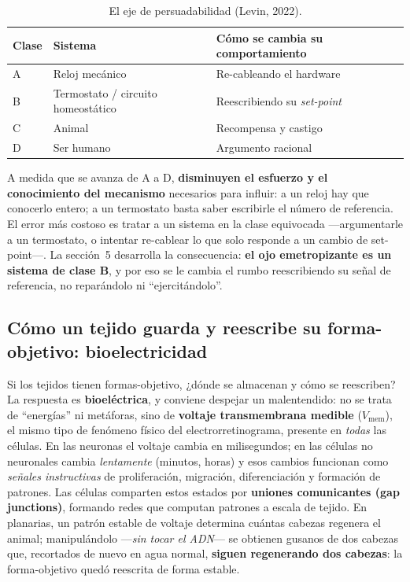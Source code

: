 \documentclass[11pt,a4paper]{article}
\begin{document}
\begin{table}[h]
\centering
\caption{El eje de persuadabilidad (Levin, 2022).}
\label{tab:persuad}
\begin{tabular}{@{}lll@{}}
\toprule
\textbf{Clase} & \textbf{Sistema} & \textbf{Cómo se cambia su comportamiento} \\
\midrule
A & Reloj mecánico & Re-cableando el hardware \\
B & Termostato / circuito homeostático & Reescribiendo su \emph{set-point} \\
C & Animal & Recompensa y castigo \\
D & Ser humano & Argumento racional \\
\bottomrule
\end{tabular}
\end{table}

A medida que se avanza de A a D, \textbf{disminuyen el esfuerzo y el conocimiento del mecanismo} necesarios para influir: a un reloj hay que conocerlo entero; a un termostato basta saber escribirle el número de referencia. El error más costoso es tratar a un sistema en la clase equivocada ---argumentarle a un termostato, o intentar re-cablear lo que solo responde a un cambio de set-point---. La sección~5 desarrolla la consecuencia: \textbf{el ojo emetropizante es un sistema de clase B}, y por eso se le cambia el rumbo reescribiendo su señal de referencia, no reparándolo ni \enquote{ejercitándolo}.

\subsection{Cómo un tejido guarda y reescribe su forma-objetivo: bioelectricidad}

Si los tejidos tienen formas-objetivo, ¿dónde se almacenan y cómo se reescriben? La respuesta es \textbf{bioeléctrica}, y conviene despejar un malentendido: no se trata de \enquote{energías} ni metáforas, sino de \textbf{voltaje transmembrana medible} ($V_\mathrm{mem}$), el mismo tipo de fenómeno físico del electrorretinograma, presente en \emph{todas} las células. En las neuronas el voltaje cambia en milisegundos; en las células no neuronales cambia \emph{lentamente} (minutos, horas) y esos cambios funcionan como \emph{señales instructivas} de proliferación, migración, diferenciación y formación de patrones. Las células comparten estos estados por \textbf{uniones comunicantes (gap junctions)}, formando redes que computan patrones a escala de tejido. En planarias, un patrón estable de voltaje determina cuántas cabezas regenera el animal; manipulándolo ---\emph{sin tocar el ADN}--- se obtienen gusanos de dos cabezas que, recortados de nuevo en agua normal, \textbf{siguen regenerando dos cabezas}: la forma-objetivo quedó reescrita de forma estable.
\end{document}
